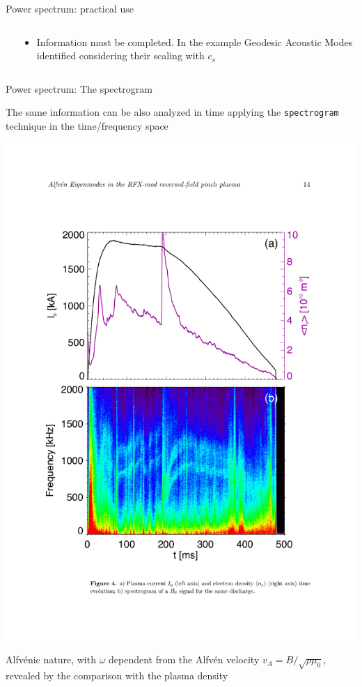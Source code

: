 \documentclass[t,10pt]{beamer}
\begin{document}
\begin{frame}{Power spectrum: practical use}
{\begin{columns}[c]
\begin{column}{0.6\textwidth}
\end{column}
\begin{column}{0.4\textwidth}
{\small \begin{itemize}
\item Information must be completed. In the
  example \textcolor{taskyblue}{Geodesic Acoustic Modes} identified
  considering their scaling with $c_s$
\end{itemize}}
\end{column}
\end{columns}
}\end{frame}

\begin{frame}{Power spectrum: The spectrogram}
\begin{itemize}
{\footnotesize \item The same information can be also analyzed in time applying the
  \textcolor{tascarletred}{\texttt{spectrogram}} technique in the time/frequency
  space {\footnotesize \parencite{spagnolo}}
}

\begin{center}
\includegraphics[height=5.cm]{alfven} 
\end{center}
{\footnotesize\item Alfv\'enic nature, with $\omega$ dependent from the
  Alfv\'en velocity $v_A = B/\sqrt{\rho\mu_0}$, revealed by the
  comparison with the plasma density
}\end{itemize}
\end{frame}
\end{document}
